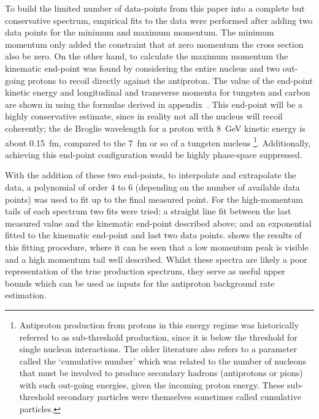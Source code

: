 \FigAntiprotonEndpoint
To build the limited number of data-points from this paper into a complete but conservative spectrum, empirical fits to the data were performed after adding two data points for the minimum and maximum momentum.
The minimum momentum only added the constraint that at zero momentum the cross section also be zero.
On the other hand, to calculate the maximum momentum the kinematic end-point was found by considering the entire nucleus and two out-going protons to recoil directly against the antiproton.
The value of the end-point kinetic energy and longitudinal and transverse momenta for tungsten and carbon are shown in  using the formulae derived in appendix~.
This end-point will be a highly conservative estimate, since in reality not all the nucleus will recoil coherently;  the de Broglie wavelength for a proton with 8~GeV kinetic energy is about 0.15~fm, compared to the 7~fm or so of a tungsten nucleus%
\footnote{Antiproton production from protons in this energy regime was historically referred to as sub-threshold production, since it is below the threshold for single nucleon interactions.
  The older literature also refers to a parameter called the `cumulative number' which was related to the number of nucleons that must be involved to produce secondary hadrons (\eg antiprotons or pions) with such out-going energies, given the incoming proton energy.  
These sub-threshold secondary particles were themselves sometimes called cumulative particles.}.
Additionally, achieving this end-point configuration would be highly phase-space suppressed.

\FigAntiprotonFits
With the addition of these two end-points, to interpolate and extrapolate the data, a polynomial of order 4 to 6 (depending on the number of available data points) was used to fit up to the final measured point.
For the high-momentum tails of each spectrum two fits were tried: a straight line fit between the last measured value and the kinematic end-point described above; and an exponential fitted to the kinematic end-point and last two data points.  
 shows the results of this fitting procedure, where it can be seen that a low momentum peak is visible and a high momentum tail well described.
Whilst these spectra are likely a poor representation of the true production spectrum, they serve as useful upper bounds which can be used as inputs for the antiproton background rate estimation.

